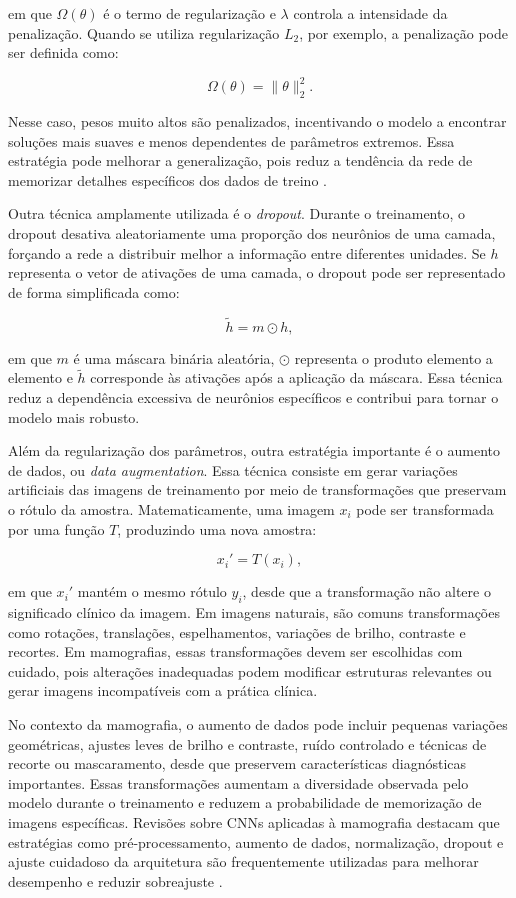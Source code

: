 \documentclass[
    12pt,
    openright,
    oneside,
    a4paper,
    english,
    brazil
]{abntex2}
\begin{document}
em que \(\Omega(\theta)\) é o termo de regularização e \(\lambda\) controla a intensidade da penalização. Quando se utiliza regularização \(L_2\), por exemplo, a penalização pode ser definida como:

\[
\Omega(\theta) = \|\theta\|_2^2.
\]

Nesse caso, pesos muito altos são penalizados, incentivando o modelo a encontrar soluções mais suaves e menos dependentes de parâmetros extremos. Essa estratégia pode melhorar a generalização, pois reduz a tendência da rede de memorizar detalhes específicos dos dados de treino \cite{goodfellow2016deep}.

Outra técnica amplamente utilizada é o \textit{dropout}. Durante o treinamento, o dropout desativa aleatoriamente uma proporção dos neurônios de uma camada, forçando a rede a distribuir melhor a informação entre diferentes unidades. Se \(h\) representa o vetor de ativações de uma camada, o dropout pode ser representado de forma simplificada como:

\[
\tilde{h} = m \odot h,
\]

em que \(m\) é uma máscara binária aleatória, \(\odot\) representa o produto elemento a elemento e \(\tilde{h}\) corresponde às ativações após a aplicação da máscara. Essa técnica reduz a dependência excessiva de neurônios específicos e contribui para tornar o modelo mais robusto.

Além da regularização dos parâmetros, outra estratégia importante é o aumento de dados, ou \textit{data augmentation}. Essa técnica consiste em gerar variações artificiais das imagens de treinamento por meio de transformações que preservam o rótulo da amostra. Matematicamente, uma imagem \(x_i\) pode ser transformada por uma função \(T\), produzindo uma nova amostra:

\[
x_i' = T(x_i),
\]

em que \(x_i'\) mantém o mesmo rótulo \(y_i\), desde que a transformação não altere o significado clínico da imagem. Em imagens naturais, são comuns transformações como rotações, translações, espelhamentos, variações de brilho, contraste e recortes. Em mamografias, essas transformações devem ser escolhidas com cuidado, pois alterações inadequadas podem modificar estruturas relevantes ou gerar imagens incompatíveis com a prática clínica.

No contexto da mamografia, o aumento de dados pode incluir pequenas variações geométricas, ajustes leves de brilho e contraste, ruído controlado e técnicas de recorte ou mascaramento, desde que preservem características diagnósticas importantes. Essas transformações aumentam a diversidade observada pelo modelo durante o treinamento e reduzem a probabilidade de memorização de imagens específicas. Revisões sobre CNNs aplicadas à mamografia destacam que estratégias como pré-processamento, aumento de dados, normalização, dropout e ajuste cuidadoso da arquitetura são frequentemente utilizadas para melhorar desempenho e reduzir sobreajuste \cite{abdelhafiz2019}.
\end{document}

